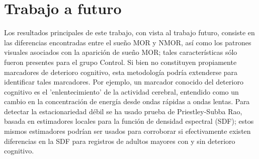\documentclass[12pt,a4paper]{mitthesis}
\begin{document}
\section{Trabajo a futuro}


Los resultados principales de este trabajo, con vista al trabajo futuro, 
consiste en las diferencias encontradas entre el sue\~no MOR y NMOR,
as\'i como los patrones visuales asociados con la aparici\'on de sue\~no MOR; tales caracter\'isticas
s\'olo fueron presentes para el grupo Control. Si bien
no constituyen propiamente marcadores de deterioro cognitivo, esta metodolog\'ia
podr\'ia extenderse para identificar tales marcadores.
%
Por ejemplo, un marcador conocido \cite{Becerra12} del deterioro cognitivo es el 'enlentecimiento' de la actividad
cerebral, entendido como un cambio en la concentraci\'on de energ\'ia desde ondas r\'apidas a 
ondas lentas.
Para detectar la estacionariedad d\'ebil se ha usado prueba de Priestley-Subba Rao, 
basada en estimadores locales para la funci\'on de densidad espectral (SDF);
estos mismos estimadores podr\'ian ser usados para corroborar si efectivamente existen
diferencias en la SDF para registros de adultos mayores con y sin deterioro cognitivo. 

\end{document}

